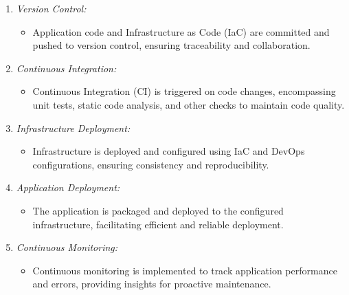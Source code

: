 \documentclass[12pt, letterpaper]{article}
\begin{document}
\begin{enumerate}
    \item \textit{Version Control:}
    \begin{itemize}
        \item Application code and Infrastructure as Code (IaC) are committed and pushed to version control, ensuring traceability and collaboration.
    \end{itemize}
    
    \item \textit{Continuous Integration:}
    \begin{itemize}
        \item Continuous Integration (CI) is triggered on code changes, encompassing unit tests, static code analysis, and other checks to maintain code quality.
    \end{itemize}
    
    \item \textit{Infrastructure Deployment:}
    \begin{itemize}
        \item Infrastructure is deployed and configured using IaC and DevOps configurations, ensuring consistency and reproducibility.
    \end{itemize}
    
    \item \textit{Application Deployment:}
    \begin{itemize}
        \item The application is packaged and deployed to the configured infrastructure, facilitating efficient and reliable deployment.
    \end{itemize}
    \vspace{1cm}
    \item \textit{Continuous Monitoring:}
    \begin{itemize}
        \item Continuous monitoring is implemented to track application performance and errors, providing insights for proactive maintenance.
    \end{itemize}
    

\end{enumerate}
\end{document}
